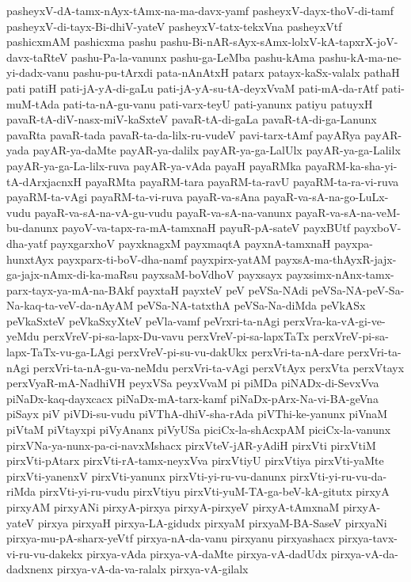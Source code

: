 {pasheyxV-dA-tamx-nAyx-tAmx-na-ma-davx-yamf
pasheyxV-dayx-thoV-di-tamf
pasheyxV-di-tayx-Bi-dhiV-yateV
pasheyxV-tatx-tekxVna
pasheyxVtf
pashicxmAM
pashicxma
pashu
pashu-Bi-nAR-sAyx-sAmx-lolxV-kA-tapxrX-joV-davx-taRteV
pashu-Pa-la-vanunx
pashu-ga-LeMba
pashu-kAma
pashu-kA-ma-ne-yi-dadx-vanu
pashu-pu-tArxdi
pata-nAnAtxH
patarx
patayx-kaSx-valalx
pathaH
pati
patiH
pati-jA-yA-di-gaLu
pati-jA-yA-su-tA-deyxVvaM
pati-mA-da-rAtf
pati-muM-tAda
pati-ta-nA-gu-vanu
pati-varx-teyU
pati-yanunx
patiyu
patuyxH
pavaR-tA-diV-nasx-miV-kaSxteV
pavaR-tA-di-gaLa
pavaR-tA-di-ga-Lanunx
pavaRta
pavaR-tada
pavaR-ta-da-lilx-ru-vudeV
pavi-tarx-tAmf
payARya
payAR-yada
payAR-ya-daMte
payAR-ya-dalilx
payAR-ya-ga-LalUlx
payAR-ya-ga-Lalilx
payAR-ya-ga-La-lilx-ruva
payAR-ya-vAda
payaH
payaRMka
payaRM-ka-sha-yi-tA-dArxjacnxH
payaRMta
payaRM-tara
payaRM-ta-ravU
payaRM-ta-ra-vi-ruva
payaRM-ta-vAgi
payaRM-ta-vi-ruva
payaR-va-sAna
payaR-va-sA-na-go-LuLx-vudu
payaR-va-sA-na-vA-gu-vudu
payaR-va-sA-na-vanunx
payaR-va-sA-na-veM-bu-danunx
payoV-va-tapx-ra-mA-tamxnaH
payuR-pA-sateV
payxBUtf
payxboV-dha-yatf
payxgarxhoV
payxknagxM
payxmaqtA
payxnA-tamxnaH
payxpa-hunxtAyx
payxparx-ti-boV-dha-namf
payxpirx-yatAM
payxsA-ma-thAyxR-jajx-ga-jajx-nAmx-di-ka-maRsu
payxsaM-boVdhoV
payxsayx
payxsimx-nAnx-tamx-parx-tayx-ya-mA-na-BAkf
payxtaH
payxteV
peV
peVSa-NAdi
peVSa-NA-peV-Sa-Na-kaq-ta-veV-da-nAyAM
peVSa-NA-tatxthA
peVSa-Na-diMda
peVkASx
peVkaSxteV
peVkaSxyXteV
peVla-vamf
peVrxri-ta-nAgi
perxVra-ka-vA-gi-ve-yeMdu
perxVreV-pi-sa-lapx-Du-vavu
perxVreV-pi-sa-lapxTaTx
perxVreV-pi-sa-lapx-TaTx-vu-ga-LAgi
perxVreV-pi-su-vu-dakUkx
perxVri-ta-nA-dare
perxVri-ta-nAgi
perxVri-ta-nA-gu-va-neMdu
perxVri-ta-vAgi
perxVtAyx
perxVta
perxVtayx
perxVyaR-mA-NadhiVH
peyxVSa
peyxVvaM
pi
piMDa
piNADx-di-SevxVva
piNaDx-kaq-dayxcacx
piNaDx-mA-tarx-kamf
piNaDx-pArx-Na-vi-BA-geVna
piSayx
piV
piVDi-su-vudu
piVThA-dhiV-sha-rAda
piVThi-ke-yanunx
piVnaM
piVtaM
piVtayxpi
piVyAnanx
piVyUSa
piciCx-la-shAcxpAM
piciCx-la-vanunx
pirxVNa-ya-nunx-pa-ci-navxMshacx
pirxVteV-jAR-yAdiH
pirxVti
pirxVtiM
pirxVti-pAtarx
pirxVti-rA-tamx-neyxVva
pirxVtiyU
pirxVtiya
pirxVti-yaMte
pirxVti-yanenxV
pirxVti-yanunx
pirxVti-yi-ru-vu-danunx
pirxVti-yi-ru-vu-da-riMda
pirxVti-yi-ru-vudu
pirxVtiyu
pirxVti-yuM-TA-ga-beV-kA-gitutx
pirxyA
pirxyAM
pirxyANi
pirxyA-pirxya
pirxyA-pirxyeV
pirxyA-tAmxnaM
pirxyA-yateV
pirxya
pirxyaH
pirxya-LA-gidudx
pirxyaM
pirxyaM-BA-SaseV
pirxyaNi
pirxya-mu-pA-sharx-yeVtf
pirxya-nA-da-vanu
pirxyanu
pirxyashacx
pirxya-tavx-vi-ru-vu-dakekx
pirxya-vAda
pirxya-vA-daMte
pirxya-vA-dadUdx
pirxya-vA-da-dadxnenx
pirxya-vA-da-va-ralalx
pirxya-vA-gilalx
}
